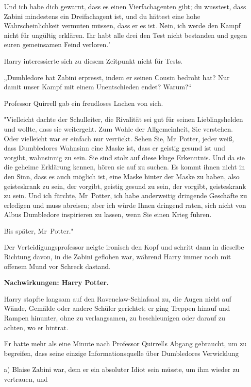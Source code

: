 {Und ich habe dich gewarnt, dass es einen Vierfachagenten gibt; du wusstest, dass Zabini mindestens ein Dreifachagent ist, und du hättest eine hohe Wahrscheinlichkeit vermuten müssen, dass er es ist. Nein, ich werde den Kampf nicht für ungültig erklären. Ihr habt alle drei den Test nicht bestanden und gegen euren gemeinsamen Feind verloren."

Harry interessierte sich zu diesem Zeitpunkt nicht für Tests.

„Dumbledore hat Zabini erpresst, indem er seinen Cousin bedroht hat? Nur damit unser Kampf mit einem Unentschieden endet? Warum?“

Professor Quirrell gab ein freudloses Lachen von sich.

"Vielleicht dachte der Schulleiter, die Rivalität sei gut für seinen Lieblingshelden und wollte, dass sie weitergeht. Zum Wohle der Allgemeinheit, Sie verstehen. Oder vielleicht war er einfach nur verrückt. Sehen Sie, Mr~Potter, jeder weiß, dass Dumbledores Wahnsinn eine Maske ist, dass er geistig gesund ist und vorgibt, wahnsinnig zu sein. Sie sind stolz auf diese kluge Erkenntnis. Und da sie die geheime Erklärung kennen, hören sie auf zu suchen. Es kommt ihnen nicht in den Sinn, dass es auch möglich ist, eine Maske hinter der Maske zu haben, also geisteskrank zu sein, der vorgibt, geistig gesund zu sein, der vorgibt, geisteskrank zu sein. Und ich fürchte, Mr~Potter, ich habe anderweitig dringende Geschäfte zu erledigen und muss abreisen; aber ich würde Ihnen dringend raten, sich nicht von Albus Dumbledore inspirieren zu lassen, wenn Sie einen Krieg führen.

Bis später, Mr~Potter."

Der Verteidigungsprofessor neigte ironisch den Kopf und schritt dann in dieselbe Richtung davon, in die Zabini geflohen war, während Harry immer noch mit offenem Mund vor Schreck dastand.

\textbf{Nachwirkungen: Harry Potter.}

Harry stapfte langsam auf den Ravenclaw-Schlafsaal zu, die Augen nicht auf Wände, Gemälde oder andere Schüler gerichtet; er ging Treppen hinauf und Rampen hinunter, ohne zu verlangsamen, zu beschleunigen oder darauf zu achten, wo er hintrat.

Er hatte mehr als eine Minute nach Professor Quirrells Abgang gebraucht, um zu begreifen, dass seine einzige Informationsquelle über Dumbledores Verwicklung

a) Blaise Zabini war, dem er ein absoluter Idiot sein müsste, um ihm wieder zu vertrauen, und

}
